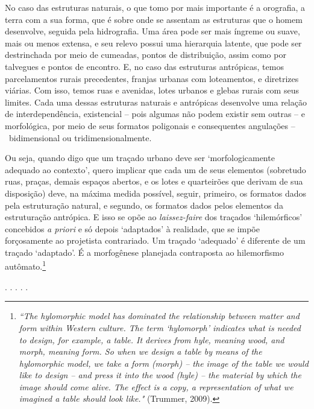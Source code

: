 \documentclass[]{report}
\begin{document}
	No caso das estruturas naturais, o que tomo por mais importante é a orografia, a terra com a sua forma, que é sobre onde se assentam as estruturas que o homem desenvolve, seguida pela hidrografia. Uma área pode ser mais íngreme ou suave, mais ou menos extensa, e seu relevo possui uma hierarquia latente, que pode ser destrinchada por meio de cumeadas, pontos de distribuição, assim como por talvegues e pontos de encontro. E, no caso das estruturas antrópicas, temos parcelamentos rurais precedentes, franjas urbanas com loteamentos, e diretrizes viárias. Com isso, temos ruas e avenidas, lotes urbanos e glebas rurais com seus limites. Cada uma dessas estruturas naturais e antrópicas desenvolve uma relação de interdependência, existencial – pois algumas não podem existir sem outras – e morfológica, por meio de seus formatos poligonais e consequentes angulações – bidimensional ou tridimensionalmente. 
	
	Ou seja, quando digo que um traçado urbano deve ser `morfologicamente adequado ao contexto', quero implicar que cada um de seus elementos (sobretudo ruas, praças, demais espaços abertos, e os lotes e quarteirões que derivam de sua disposição) deve, na máxima medida possível, seguir, primeiro, os formatos dados pela estruturação natural, e segundo, os formatos dados pelos elementos da estruturação antrópica. E isso se opõe ao \textit{laissez-faire} dos traçados `hilemórficos' concebidos \textit{a priori} e só depois `adaptados' à realidade, que se impõe forçosamente ao projetista contrariado. Um traçado `adequado' é diferente de um traçado `adaptado'. É a morfogênese planejada contraposta ao hilemorfismo autômato.\footnote[1]{\textit{``The hylomorphic model has dominated the relationship between matter and form within Western culture. The term ‘hylomorph’ indicates what is needed to design, for example, a table. It derives from \textnormal{hyle}, meaning wood, and morph, meaning form. So when we design a table by means of the hylomorphic model, we take a form \textnormal{(morph)} – the image of the table we would like to design – and press it into the wood \textnormal{(hyle)} – the material by which the image should come alive. The effect is a copy, a representation of what we imagined a table should look like."} (Trummer, 2009).}
	
	\begin{center}
		. . . . .
	\end{center}

\end{document}
